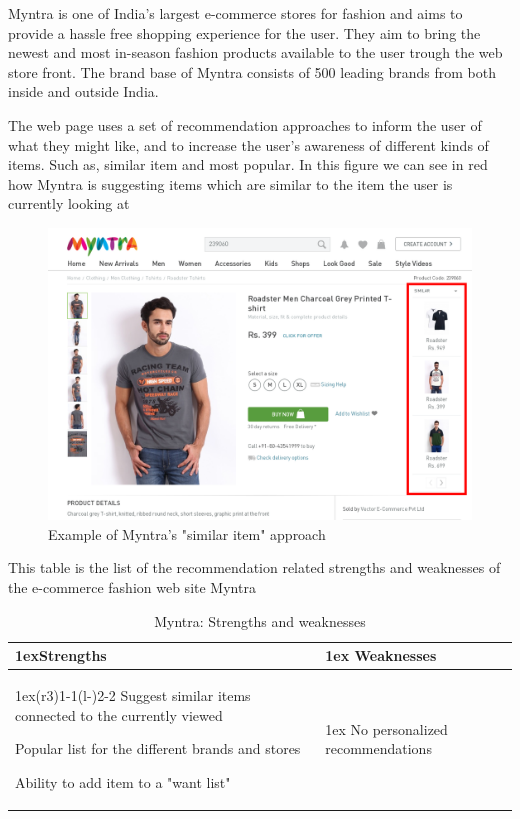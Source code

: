 Myntra is one of India's largest e-commerce stores for fashion and aims to
provide a hassle free shopping experience for the user.  They aim to bring the
newest and most in-season fashion products available to the user trough the web
store front.  The brand base of Myntra consists of 500 leading brands from both
inside and outside India.

The web page uses a set of recommendation approaches to inform the user of what
they might like, and to increase the user's awareness of different kinds of
items. Such as, similar item and most popular. In this figure we can see in red
how Myntra is suggesting items which are similar to the item the user is
currently looking at

\begin{figure}[H]
    \centering
    \includegraphics[scale=0.4]{image/myntiaSimilarExample.png}
    \caption[Example of Myntra's "similar item" approach]{Example of Myntra's
    "similar item" approach}
    \label{figure:myntiaSimilarEx}
\end{figure}

This table is the list of the recommendation related strengths and weaknesses
of the e-commerce fashion web site Myntra~\cite{myntra}

\begin{table}[H]
    \centering
    \begin{tabularx}{\linewidth}{>{\parskip1ex}X@{\kern4\tabcolsep}>{\parskip1ex}X}
        \toprule
        \hfil\bfseries Strengths
        &
        \hfil\bfseries Weaknesses
        \\\cmidrule(r{3\tabcolsep}){1-1}\cmidrule(l{-\tabcolsep}){2-2}
      Suggest similar items connected to the currently viewed \par
        Popular list for the different brands and stores \par
        Ability to add item to a "want list"\par
        &
        No personalized recommendations \par
        \\\bottomrule
    \end{tabularx}
    \caption{Myntra: Strengths and weaknesses}
    \label{table:ecommerceMyntra}
\end{table}

